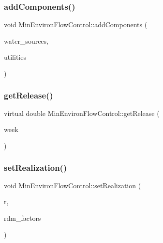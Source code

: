 \subsubsection{\texorpdfstring{add\+Components()}{addComponents()}}
{\footnotesize\ttfamily void Min\+Environ\+Flow\+Control\+::add\+Components (\begin{DoxyParamCaption}\item[{vector$<$ \mbox{\hyperlink{classWaterSource}{Water\+Source}} $\ast$$>$}]{water\+\_\+sources,  }\item[{vector$<$ \mbox{\hyperlink{classUtility}{Utility}} $\ast$$>$}]{utilities }\end{DoxyParamCaption})}

\mbox{\label{classMinEnvironFlowControl_ac7357455a533f7e6882cdb1ef303359b_ac7357455a533f7e6882cdb1ef303359b}} 
\subsubsection{\texorpdfstring{get\+Release()}{getRelease()}}
{\footnotesize\ttfamily virtual double Min\+Environ\+Flow\+Control\+::get\+Release (\begin{DoxyParamCaption}\item[{int}]{week }\end{DoxyParamCaption})\hspace{0.3cm}{\ttfamily [pure virtual]}}

\mbox{\label{classMinEnvironFlowControl_a99dd7bb49edc3ae8f919e403ccc92bd9_a99dd7bb49edc3ae8f919e403ccc92bd9}} 
\subsubsection{\texorpdfstring{set\+Realization()}{setRealization()}}
{\footnotesize\ttfamily void Min\+Environ\+Flow\+Control\+::set\+Realization (\begin{DoxyParamCaption}\item[{unsigned int}]{r,  }\item[{vector$<$ double $>$ \&}]{rdm\+\_\+factors }\end{DoxyParamCaption})\hspace{0.3cm}{\ttfamily [virtual]}}



